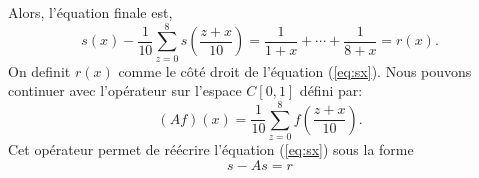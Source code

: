 Alors, l'\'equation finale est,
\begin{equation}
	s(x) - \frac{1}{10}\sum_{z=0}^8 s(\frac{z+x}{10}) = \frac{1}{1+x} + \cdots +
	\frac{1}{8+x} = r(x).
	\label{eq:sx}
\end{equation}
On definit $r(x)$ comme le c\^{o}t\'e droit de l'\'equation (\ref{eq:sx}).
Nous pouvons continuer avec l'op\'erateur sur l'espace $C[0,1]$ d\'efini par:
\begin{equation}
	(Af)(x) = \frac{1}{10}\sum_{z=0}^{8} f(\frac{z+x}{10}).
	\label{eq:defA}
\end{equation}
Cet op\'erateur permet de r\'e\'ecrire l'\'equation (\ref{eq:sx}) sous la forme
\begin{equation}
	s -As = r
	\label{eq:shortEq}
\end{equation}
